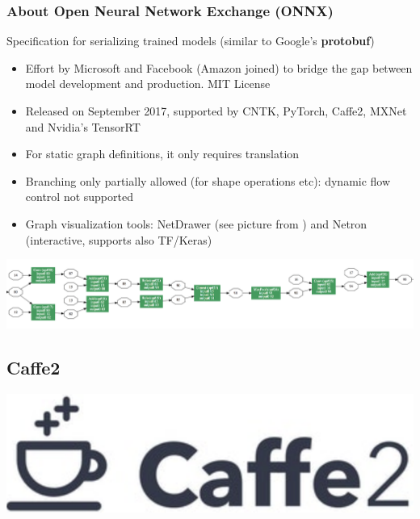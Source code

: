 \documentclass[hyperref={pdfpagelabels=false}]{beamer}
\begin{document}
     \begin{frame}
       \frametitle{About Open Neural Network Exchange (ONNX)}
       Specification for serializing trained models (similar to Google's \textbf{protobuf})
       \begin{itemize}[<.->]
       \item{Effort by Microsoft and Facebook (Amazon joined) to bridge the gap between model development and production. MIT License}
       \item{Released on September 2017, supported by CNTK, PyTorch, Caffe2, MXNet and Nvidia's TensorRT}
       \item{For static graph definitions, it only requires translation}
       \item {Branching only partially allowed (for shape operations etc): dynamic flow control not supported}
       \item {Graph visualization tools: NetDrawer (see picture from \cite{onnx-repo}) and Netron (interactive, supports also TF/Keras)}
       \end{itemize}
       
       \centering
       \includegraphics[scale=0.2]{onnx_visualization.png}
     \end{frame}


     \subsection{Caffe2} %
     \begin{frame}[c] %
       \begin{center}
         \vspace{8mm}
         \includegraphics[scale=0.2]{logo_caffe2.png}
       \end{center}
     \end{frame}
\end{document}
